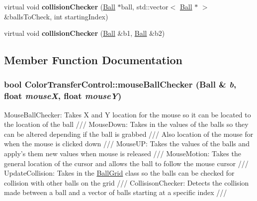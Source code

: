 \begin{DoxyCompactItemize}
\item 
\hypertarget{classColorTransferControl_a2a5fae5e92692b533d92ddf112661a17}{
virtual void {\bfseries collisionChecker} (\hyperlink{structBall}{Ball} $\ast$ball, std::vector$<$ \hyperlink{structBall}{Ball} $\ast$ $>$ \&ballsToCheck, int startingIndex)}
\label{classColorTransferControl_a2a5fae5e92692b533d92ddf112661a17}

\item 
\hypertarget{classColorTransferControl_a3071e883130aabc2b0642a75bf9225dc}{
virtual void {\bfseries collisionChecker} (\hyperlink{structBall}{Ball} \&b1, \hyperlink{structBall}{Ball} \&b2)}
\label{classColorTransferControl_a3071e883130aabc2b0642a75bf9225dc}

\end{DoxyCompactItemize}


\subsection{Member Function Documentation}
\hypertarget{classColorTransferControl_a9bce863f9d08a2dd596a56a432861559}{
\subsubsection[{mouseBallChecker}]{\setlength{\rightskip}{0pt plus 5cm}bool ColorTransferControl::mouseBallChecker ({\bf Ball} \& {\em b}, \/  float {\em mouseX}, \/  float {\em mouseY})}}
\label{classColorTransferControl_a9bce863f9d08a2dd596a56a432861559}
MouseBallChecker: Takes X and Y location for the mouse so it can be located to the location of the ball /// MouseDown: Takes in the values of the balls so they can be altered depending if the ball is grabbed /// Also location of the mouse for when the mouse is clicked down /// MouseUP: Takes the values of the balls and apply's them new values when mouse is released /// MouseMotion: Takes the general location of the cursor and allows the ball to follow the mouse cursor /// UpdateCollision: Takes in the \hyperlink{classBallGrid}{BallGrid} class so the balls can be checked for collision with other balls on the grid /// CollisisonChecker: Detects the collision made between a ball and a vector of balls starting at a specific index /// 


